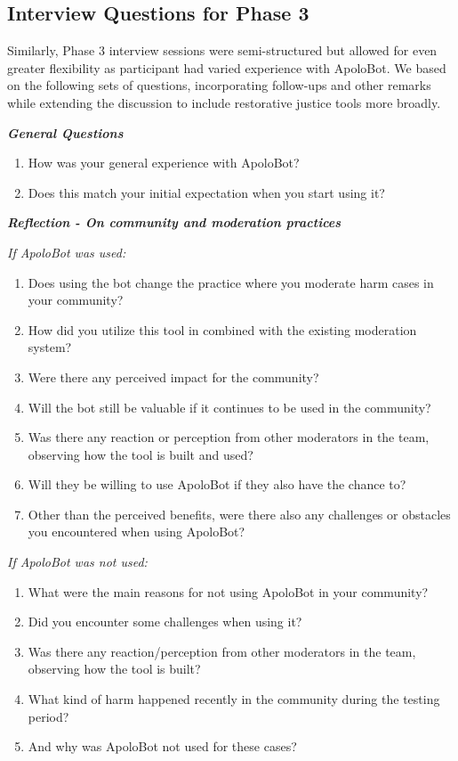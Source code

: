\subsection{Interview Questions for Phase 3}
Similarly, Phase 3 interview sessions were semi-structured but allowed for even greater flexibility as participant had varied experience with ApoloBot. We based on the following sets of questions, incorporating follow-ups and other remarks while extending the discussion to include restorative justice tools more broadly.

\textbf{\textit{General Questions}}
\begin{enumerate}
    \item How was your general experience with ApoloBot?
    \item Does this match your initial expectation when you start using it?
\end{enumerate}

\textbf{\textit{Reflection - On community and moderation practices}}

\textit{If ApoloBot was used:}
\begin{enumerate}
    \item Does using the bot change the practice where you moderate harm cases in your community?
    \item How did you utilize this tool in combined with the existing moderation system?
    \item Were there any perceived impact for the community? 
    \item Will the bot still be valuable if it continues to be used in the community?
    \item Was there any reaction or perception from other moderators in the team, observing how the tool is built and used?
    \item Will they be willing to use ApoloBot if they also have the chance to?
    \item Other than the perceived benefits, were there also any challenges or obstacles you encountered when using ApoloBot?
\end{enumerate}

\textit{If ApoloBot was not used:}

\begin{enumerate}
    \item What were the main reasons for not using ApoloBot in your community?
    \item Did you encounter some challenges when using it?
    \item Was there any reaction/perception from other moderators in the team, observing how the tool is built?
    \item What kind of harm happened recently in the community during the testing period?
    \item And why was ApoloBot not used for these cases?
\end{enumerate}

